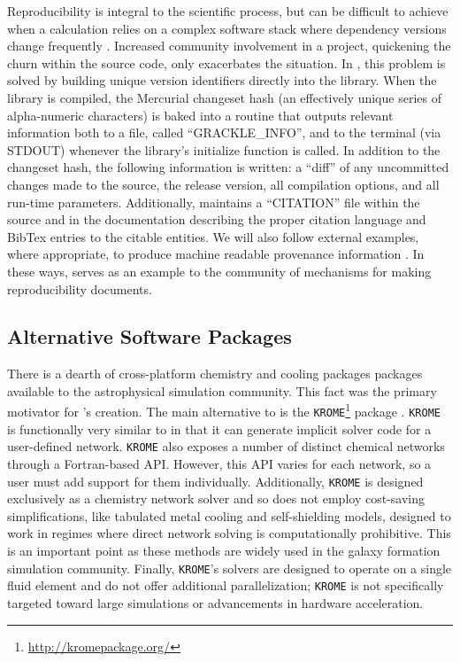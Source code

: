 Reproducibility is integral to the scientific process, but can be
difficult to achieve when a calculation relies on a complex software
stack where dependency versions change frequently
\citep{2014arXiv1412.5557J, 2016arXiv161009958L}.  Increased
community involvement in a project, quickening the churn within the
source code, only exacerbates the situation.  In \grackle{}, this
problem is solved by building unique version identifiers directly
into the library.  When the library is compiled, the Mercurial
changeset hash (an effectively unique series of alpha-numeric
characters) is baked into a routine that outputs relevant information
both to a file, called ``GRACKLE\_INFO'', and to the terminal (via
STDOUT) whenever the library's initialize function is called.  In
addition to the changeset hash, the following information is written:
a ``diff'' of any uncommitted changes made to the source, the release
version, all compilation options, and all run-time parameters.
Additionally, \grackle{} maintains a ``CITATION'' file within the
source and in the documentation describing the proper citation
language and BibTex entries to the citable entities.  We will also
follow external examples, where appropriate, to produce machine
readable provenance information \citep[e.g.,][]{force11,
  Fenner097196}.  In these ways, \grackle{} serves as an example to
the community of mechanisms for making reproducibility documents.

\subsection{Alternative Software Packages}

There is a dearth of cross-platform chemistry and cooling packages 
packages available to the astrophysical simulation community.  This
fact was the primary motivator for \grackle{}'s creation.  The main
alternative to \grackle{} is the 
\texttt{KROME}\footnote{\url{http://kromepackage.org/}} package
\citep{2014MNRAS.439.2386G}.  \texttt{KROME} is functionally very
similar to \dengo{} in that it can generate implicit solver code for a
user-defined network.  \texttt{KROME} also exposes a number of
distinct chemical networks through a Fortran-based API.  However, this
API varies for each network, so a user must add support for them
individually.  Additionally, \texttt{KROME} is designed exclusively as
a chemistry network solver and so does not employ cost-saving
simplifications, like tabulated metal cooling and self-shielding
models, designed to work in regimes where direct network solving is
computationally prohibitive.  This is an important point as these
methods are widely used in the galaxy formation simulation community.
Finally, \texttt{KROME}'s solvers are designed to operate on a single
fluid element and do not offer additional parallelization;
\texttt{KROME} is not specifically targeted toward large simulations
or advancements in hardware acceleration.

